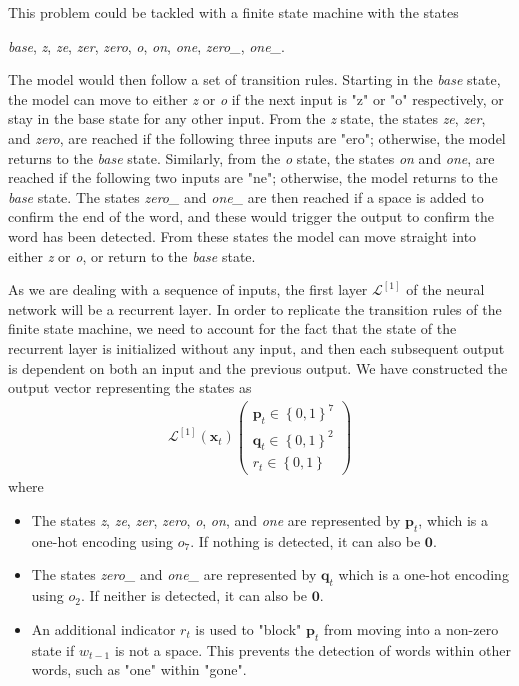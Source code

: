 \documentclass{somasmsc}
\begin{document}
This problem could be tackled with a finite state machine with the states
\begin{center}
    \textit{base}, \textit{z}, \textit{ze}, \textit{zer}, \textit{zero}, \textit{o}, \textit{on}, \textit{one}, \textit{zero\_}, \textit{one\_}.
\end{center}
The model would then follow a set of transition rules. Starting in the \textit{base} state, the model can move to either \textit{z} or \textit{o} if the next input is "z" or "o" respectively, or stay in the base state for any other input. From the \textit{z} state, the states \textit{ze}, \textit{zer}, and \textit{zero}, are reached if the following three inputs are "ero"; otherwise, the model returns to the \textit{base} state. Similarly, from the \textit{o} state, the states \textit{on} and \textit{one}, are reached if the following two inputs are "ne"; otherwise, the model returns to the \textit{base} state. The states \textit{zero\_} and \textit{one\_} are then reached if a space is added to confirm the end of the word, and these would trigger the output to confirm the word has been detected. From these states the model can move straight into either \textit{z} or \textit{o}, or return to the \textit{base} state.

As we are dealing with a sequence of inputs, the first layer $\mathcal{L}^{\left[1\right]}$ of the neural network will be a recurrent layer. In order to replicate the transition rules of the finite state machine, we need to account for the fact that the state of the recurrent layer is initialized without any input, and then each subsequent output is dependent on both an input and the previous output. We have constructed the output vector representing the states as
\begin{align*}
    \mathcal{L}^{\left[1\right]}\left(\pmb{x}_t\right)
    \begin{pmatrix}
        \pmb{p}_t \in \left\{0,1\right\}^7 \\
        \pmb{q}_t \in \left\{0,1\right\}^2 \\
        r_t \in \left\{0,1\right\}
    \end{pmatrix}
\end{align*}
where
\begin{itemize}
    \item The states \textit{z}, \textit{ze}, \textit{zer}, \textit{zero}, \textit{o}, \textit{on}, and \textit{one} are represented by $\pmb{p}_t$, which is a one-hot encoding using $o_7$. If nothing is detected, it can also be $\mathbf{0}$.
    \item The states \textit{zero\_} and \textit{one\_} are represented by $\pmb{q}_t$ which is a one-hot encoding using $o_2$. If neither is detected, it can also be $\mathbf{0}$.
    \item An additional indicator $r_t$ is used to "block" $\pmb{p}_t$ from moving into a non-zero state if $w_{t-1}$ is not a space. This prevents the detection of words within other words, such as "one" within "gone".
\end{itemize}
\end{document}
